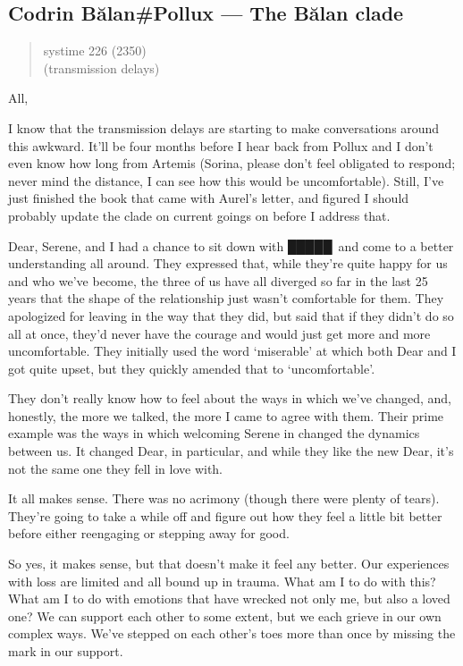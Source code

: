 \hypertarget{codrin-bux103lanpollux-the-bux103lan-clade}{%
\subsection{Codrin Bălan\#Pollux — The Bălan clade}\label{codrin-bux103lanpollux-the-bux103lan-clade}}

\begin{quote}
systime 226 (2350)\\
(transmission delays)
\end{quote}

All,

I know that the transmission delays are starting to make conversations around this awkward. It'll be four months before I hear back from Pollux and I don't even know how long from Artemis (Sorina, please don't feel obligated to respond; never mind the distance, I can see how this would be uncomfortable). Still, I've just finished the book that came with Aurel's letter, and figured I should probably update the clade on current goings on before I address that.

Dear, Serene, and I had a chance to sit down with █████\ and come to a better understanding all around. They expressed that, while they're quite happy for us and who we've become, the three of us have all diverged so far in the last 25 years that the shape of the relationship just wasn't comfortable for them. They apologized for leaving in the way that they did, but said that if they didn't do so all at once, they'd never have the courage and would just get more and more uncomfortable. They initially used the word `miserable' at which both Dear and I got quite upset, but they quickly amended that to `uncomfortable'.

They don't really know how to feel about the ways in which we've changed, and, honestly, the more we talked, the more I came to agree with them. Their prime example was the ways in which welcoming Serene in changed the dynamics between us. It changed Dear, in particular, and while they like the new Dear, it's not the same one they fell in love with.

It all makes sense. There was no acrimony (though there were plenty of tears). They're going to take a while off and figure out how they feel a little bit better before either reengaging or stepping away for good.

So yes, it makes sense, but that doesn't make it feel any better. Our experiences with loss are limited and all bound up in trauma. What am I to do with this? What am I to do with emotions that have wrecked not only me, but also a loved one? We can support each other to some extent, but we each grieve in our own complex ways. We've stepped on each other's toes more than once by missing the mark in our support.

